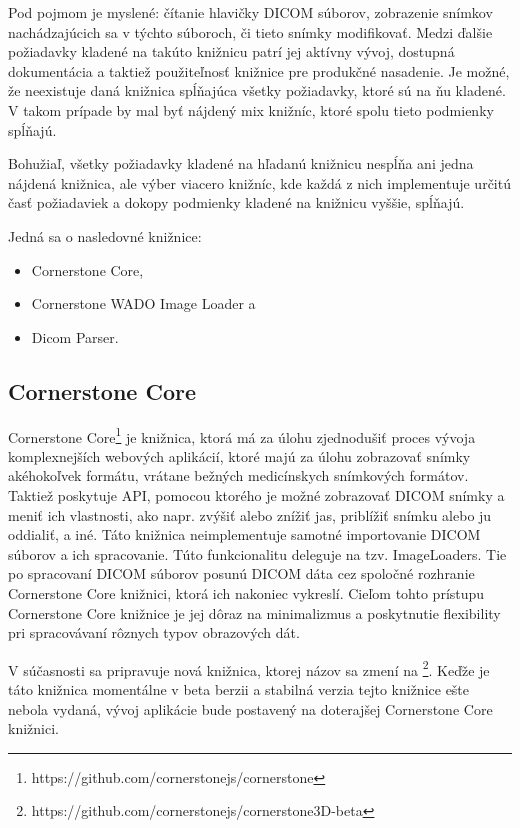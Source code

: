 Pod pojmom  je myslené: čítanie hlavičky DICOM súborov, zobrazenie snímkov nachádzajúcich sa v týchto súboroch, či tieto snímky modifikovať. Medzi ďalšie požiadavky kladené na takúto knižnicu patrí jej aktívny vývoj, dostupná dokumentácia a taktiež použiteľnosť knižnice pre produkčné nasadenie. Je možné, že neexistuje daná knižnica spĺňajúca všetky požiadavky, ktoré sú na ňu kladené. V takom prípade by mal byť nájdený mix knižníc, ktoré spolu tieto podmienky spĺňajú.

Bohužiaľ, všetky požiadavky kladené na hľadanú knižnicu nespĺňa ani jedna nájdená knižnica, ale výber viacero knižníc, kde každá z nich implementuje určitú časť požiadaviek a dokopy podmienky kladené na knižnicu vyššie, spĺňajú.

Jedná sa o nasledovné knižnice:
\begin {itemize}
\item {Cornerstone Core,}
\item {Cornerstone WADO Image Loader a}
\item {Dicom Parser.}
\end {itemize}

\subsection {Cornerstone Core}
Cornerstone Core\footnote{https://github.com/cornerstonejs/cornerstone} je knižnica, ktorá má za úlohu zjednodušiť proces vývoja komplexnejších webových aplikácií, ktoré majú za úlohu zobrazovať snímky akéhokoľvek formátu, vrátane bežných medicínskych snímkových formátov. Taktiež poskytuje API, pomocou ktorého je možné zobrazovať DICOM snímky a meniť ich vlastnosti, ako napr. zvýšiť alebo znížiť jas, priblížiť snímku alebo ju oddialiť, a iné.
Táto knižnica neimplementuje samotné importovanie DICOM súborov a ich spracovanie. Túto funkcionalitu deleguje na tzv. ImageLoaders. Tie po spracovaní DICOM súborov posunú DICOM dáta cez spoločné rozhranie Cornerstone Core knižnici, ktorá ich nakoniec vykreslí. Cieľom tohto prístupu Cornerstone Core knižnice je jej dôraz na minimalizmus a poskytnutie flexibility pri spracovávaní rôznych typov obrazových dát.

V súčasnosti sa pripravuje nová  knižnica, ktorej názov sa zmení na \footnote{https://github.com/cornerstonejs/cornerstone3D-beta}. Keďže je táto knižnica momentálne v beta berzii a stabilná verzia tejto knižnice ešte nebola vydaná, vývoj aplikácie bude postavený na doterajšej Cornerstone Core knižnici.

